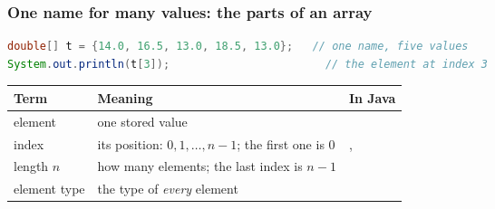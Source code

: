 \documentclass[aspectratio=169,10pt,compress]{beamer}
\begin{document}
\begin{frame}[t,fragile] \frametitle{One name for many values: the parts of an array}


\begin{lstlisting}[style=codesnippet, language=Java]
double[] t = {14.0, 16.5, 13.0, 18.5, 13.0};   // one name, five values
System.out.println(t[3]);                        // the element at index 3
\end{lstlisting}


	\begin{center}
	\end{center}


\begin{table}
		\footnotesize
		\begin{tabular}{@{}L{0.18\textwidth}L{0.50\textwidth}L{0.24\textwidth}@{}}
			\toprule
			\textbf{Term} & \textbf{Meaning} & \textbf{In Java} \\
			\midrule
			element      & one stored value                                         &  \\
			index        & its position: $0, 1, \dots, n - 1$; the first one is 0   & ,  \\
			length $n$   & how many elements; the last index is $n - 1$             &  \\
			element type & the type of \emph{every} element                         &  \\
			\bottomrule
		\end{tabular}
\end{table}%
\end{frame}
\end{document}

